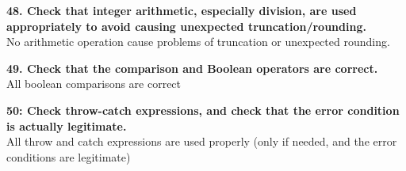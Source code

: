 \documentclass{article}
\begin{document}
\begin{flushleft}
\textbf{48. Check that integer arithmetic, especially division, are used appropriately to avoid causing unexpected truncation/rounding.}\\
\vspace{0.5cm}
No arithmetic operation cause problems of truncation or unexpected rounding.\\
\vspace{0.5cm}


\textbf{49. Check that the comparison and Boolean operators are correct.}  \\
\vspace{0.5cm}
All boolean comparisons are correct\\
\vspace{0.5cm}


\textbf{50: Check throw-catch expressions, and check that the error condition is actually legitimate.}\\
\vspace{0.5cm}
All throw and catch expressions are used properly (only if needed, and the error conditions are legitimate)\\
\vspace{0.5cm}


\end{flushleft}
\end{document}
